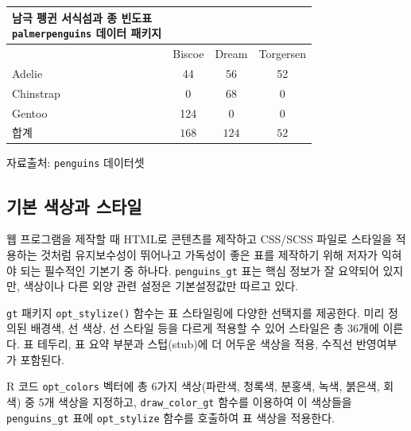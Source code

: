 \documentclass[
  letterpaper,
]{book}
\begin{document}
\setlength{\LTpost}{0mm}
\begin{longtable*}{l|ccc}
\caption*{
{\large 남극 펭귄 \textbf{서식섬과 종} 빈도표} \\ 
{\small \texttt{palmerpenguins} 데이터 패키지}
} \\ 
\toprule
{} & Biscoe & Dream & Torgersen \\ 
\midrule
Adelie & 44 & 56 & 52 \\ 
Chinstrap & 0 & 68 & 0 \\ 
Gentoo & 124 & 0 & 0 \\ 
\midrule 
\midrule 
합계 & $168$ & $124$ & $52$ \\ 
\bottomrule
\end{longtable*}
\begin{minipage}{\linewidth}
자료출처: \texttt{penguins} 데이터셋\\
\end{minipage}

\hypertarget{uxae30uxbcf8-uxc0c9uxc0c1uxacfc-uxc2a4uxd0c0uxc77c}{%
\subsection{기본 색상과
스타일}\label{uxae30uxbcf8-uxc0c9uxc0c1uxacfc-uxc2a4uxd0c0uxc77c}}

웹 프로그램을 제작할 때 HTML로 콘텐츠를 제작하고 CSS/SCSS 파일로
스타일을 적용하는 것처럼 유지보수성이 뛰어나고 가독성이 좋은 표를
제작하기 위해 저자가 익혀야 되는 필수적인 기본기 중 하나다.
\texttt{penguins\_gt} 표는 핵심 정보가 잘 요약되어 있지만, 색상이나 다른
외양 관련 설정은 기본설정값만 따르고 있다.

\texttt{gt} 패키지 \texttt{opt\_stylize()} 함수는 표 스타일링에 다양한
선택지를 제공한다. 미리 정의된 배경색, 선 색상, 선 스타일 등을 다르게
적용할 수 있어 스타일은 총 36개에 이른다. 표 테두리, 표 요약 부분과
스텁(stub)에 더 어두운 색상을 적용, 수직선 반영여부가 포함된다.

R 코드 \texttt{opt\_colors} 벡터에 총 6가지 색상(파란색, 청록색, 분홍색,
녹색, 붉은색, 회색) 중 5개 색상을 지정하고, \texttt{draw\_color\_gt}
함수를 이용하여 이 색상들을 \texttt{penguins\_gt} 표에
\texttt{opt\_stylize} 함수를 호출하여 표 색상을 적용한다.
\end{document}

